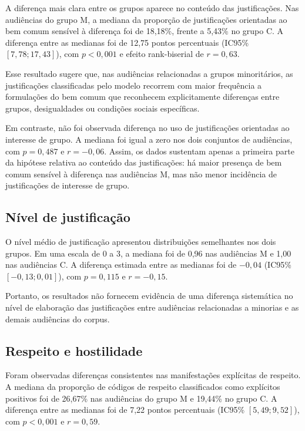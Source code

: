 A diferença mais clara entre os grupos aparece no conteúdo das justificações.
Nas audiências do grupo M, a mediana da proporção de justificações orientadas
ao bem comum sensível à diferença foi de 18,18\%, frente a 5,43\% no grupo C.
A diferença entre as medianas foi de 12,75 pontos percentuais (IC95\%
$[7{,}78;17{,}43]$), com $p<0{,}001$ e efeito rank-biserial de $r=0{,}63$.

Esse resultado sugere que, nas audiências relacionadas a grupos minoritários,
as justificações classificadas pelo modelo recorrem com maior frequência a
formulações do bem comum que reconhecem explicitamente diferenças entre grupos,
desigualdades ou condições sociais específicas.

Em contraste, não foi observada diferença no uso de justificações orientadas ao
interesse de grupo. A mediana foi igual a zero nos dois conjuntos de
audiências, com $p=0{,}487$ e $r=-0{,}06$. Assim, os dados sustentam apenas a
primeira parte da hipótese relativa ao conteúdo das justificações: há maior
presença de bem comum sensível à diferença nas audiências M, mas não menor
incidência de justificações de interesse de grupo.

\subsection{Nível de justificação}

O nível médio de justificação apresentou distribuições semelhantes nos dois
grupos. Em uma escala de 0 a 3, a mediana foi de 0,96 nas audiências M e 1,00
nas audiências C. A diferença estimada entre as medianas foi de $-0{,}04$
(IC95\% $[-0{,}13;0{,}01]$), com $p=0{,}115$ e $r=-0{,}15$.

Portanto, os resultados não fornecem evidência de uma diferença sistemática no
nível de elaboração das justificações entre audiências relacionadas a minorias
e as demais audiências do corpus.

\subsection{Respeito e hostilidade}

Foram observadas diferenças consistentes nas manifestações explícitas de
respeito. A mediana da proporção de códigos de respeito classificados como
explícitos positivos foi de 26,67\% nas audiências do grupo M e 19,44\% no
grupo C. A diferença entre as medianas foi de 7,22 pontos percentuais (IC95\%
$[5{,}49;9{,}52]$), com $p<0{,}001$ e $r=0{,}59$.


